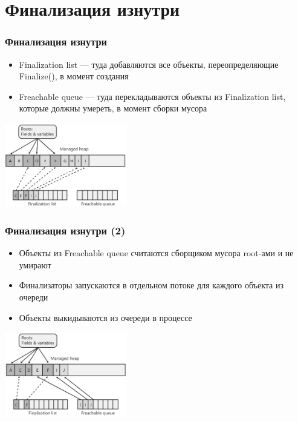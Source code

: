 \documentclass[xetex,mathserif,serif]{beamer}
\begin{document}
    \section{Финализация изнутри}

    \begin{frame}
        \frametitle{Финализация изнутри}
        \begin{itemize}
            \item Finalization list --- туда добавляются все объекты, переопределяющие Finalize(), в момент создания
            \item Freachable queue --- туда перекладываются объекты из Finalization list, которые должны умереть, в момент сборки мусора
        \end{itemize}
        \begin{center}
            \includegraphics[width=0.4\textwidth]{finalizationList.png}
        \end{center}
    \end{frame}

    \begin{frame}
        \frametitle{Финализация изнутри (2)}
        \begin{itemize}
            \item Объекты из Freachable queue считаются сборщиком мусора root-ами и не умирают
            \item Финализаторы запускаются в отдельном потоке для каждого объекта из очереди
            \item Объекты выкидываются из очереди в процессе
        \end{itemize}
        \begin{center}
            \includegraphics[width=0.4\textwidth]{freachableQueue.png}
        \end{center}
    \end{frame}
\end{document}
